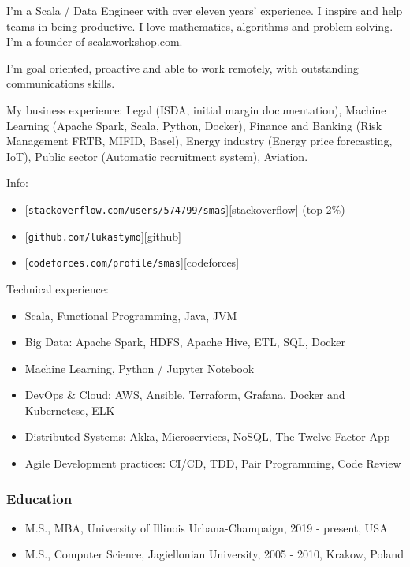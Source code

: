 \documentclass[]{rss}
\date{}
\providecommand{\tightlist}{%
  \setlength{\itemsep}{0pt}\setlength{\parskip}{0pt}}
\begin{document}
\address{\\[-9pt] lukas@codeily.com | lukastymo.com}
\begin{resume}

I'm a Scala / Data Engineer with over eleven years' experience. I
inspire and help teams in being productive. I love mathematics,
algorithms and problem-solving. I'm a founder of scalaworkshop.com.

I'm goal oriented, proactive and able to work remotely, with outstanding
communications skills.

My business experience: Legal (ISDA, initial margin documentation),
Machine Learning (Apache Spark, Scala, Python, Docker), Finance and
Banking (Risk Management FRTB, MIFID, Basel), Energy industry (Energy
price forecasting, IoT), Public sector (Automatic recruitment system),
Aviation.

Info:

\begin{itemize}
\tightlist
\item
  {[}\texttt{stackoverflow.com/users/574799/smas}{]}{[}stackoverflow{]}
  (top 2\%)
\item
  {[}\texttt{github.com/lukastymo}{]}{[}github{]}
\item
  {[}\texttt{codeforces.com/profile/smas}{]}{[}codeforces{]}
\end{itemize}

Technical experience:

\begin{itemize}
\tightlist
\item
  Scala, Functional Programming, Java, JVM
\item
  Big Data: Apache Spark, HDFS, Apache Hive, ETL, SQL, Docker
\item
  Machine Learning, Python / Jupyter Notebook
\item
  DevOps \& Cloud: AWS, Ansible, Terraform, Grafana, Docker and
  Kubernetese, ELK
\item
  Distributed Systems: Akka, Microservices, NoSQL, The Twelve-Factor App
\item
  Agile Development practices: CI/CD, TDD, Pair Programming, Code Review
\end{itemize}

\subsubsection{Education}\label{education}

\begin{itemize}
\tightlist
\item
  M.S., MBA, University of Illinois Urbana-Champaign, 2019 - present,
  USA
\item
  M.S., Computer Science, Jagiellonian University, 2005 - 2010, Krakow,
  Poland
\end{itemize}


\end{resume}
\end{document}
